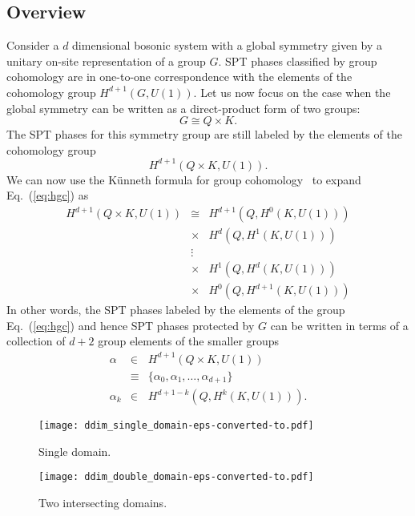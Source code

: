 \documentclass[aps,amsfonts,pra,twocolumn,showpacs]{revtex4-1}
\begin{document}
\subsection{Overview}
Consider a $d$ dimensional bosonic system with a global symmetry given by a unitary on-site representation of a group $G$. SPT phases classified by group cohomology are in one-to-one correspondence with the elements of the cohomology group $H^{d+1}(G,U(1))$. Let us now focus on the case when the global symmetry can be written as a direct-product form of two groups:
	\begin{equation}
	G \cong Q \times K.
	\end{equation}
The SPT phases for this symmetry group are still labeled by the elements of the cohomology group
	\begin{equation} \label{eq:hgc}
	H^{d+1}(Q \times K,U(1)).
	\end{equation}
We can now use the K\"{u}nneth formula for group cohomology~\cite{Chen2014} to expand Eq.~(\ref{eq:hgc}) as
	\begin{eqnarray}
	H^{d+1}(Q \times K,U(1)) &\cong& H^{d+1}(Q , H^0(K,U(1))) \nonumber \\ &\times& H^{d}(Q , H^1(K,U(1))) \nonumber \\ &\vdots& \nonumber \\
	&\times&  H^{1}(Q , H^d(K,U(1))) \nonumber \\ &\times&  H^{0}(Q , H^{d+1}(K,U(1)))
	\end{eqnarray}
In other words, the SPT phases labeled by the elements of the group Eq.~(\ref{eq:hgc}) and hence SPT phases protected by $G$ can be written in terms of a collection of $d+2$ group elements of the  smaller groups
	\begin{eqnarray}
	\alpha &\in& H^{d+1}(Q \times K,U(1)) \nonumber \\
	&\equiv& \{\alpha_0, \alpha_1,\ldots,\alpha_{d+1} \} \\
	\alpha_k &\in& H^{d+1-k}(Q , H^k(K,U(1))).
	\end{eqnarray}
	
	\begin{figure}[!htb]
		\texttt{[image: ddim\_single\_domain-eps-converted-to.pdf]}
		\caption{Single domain. \label{fig:single_domain_ddim}}
	\end{figure}

	\begin{figure}[!htb]
		\texttt{[image: ddim\_double\_domain-eps-converted-to.pdf]}
		\caption{Two intersecting domains. \label{fig:two_domains_ddim}}
	\end{figure}
\end{document}
